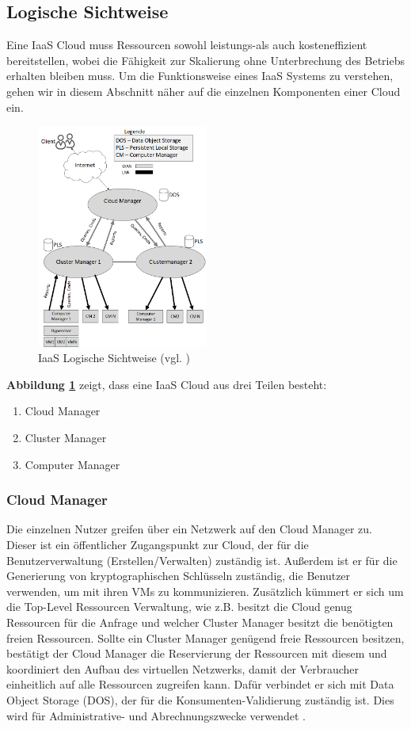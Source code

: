 \subsection{Logische Sichtweise}
Eine IaaS Cloud muss Ressourcen sowohl leistungs-als auch kosteneffizient bereitstellen, wobei die Fähigkeit zur Skalierung ohne Unterbrechung des Betriebs erhalten bleiben muss.
Um die Funktionsweise eines IaaS Systems zu verstehen, gehen wir in diesem Abschnitt näher auf die einzelnen Komponenten einer Cloud ein.
\begin{figure}[h]
    \centering
	\includegraphics[width=0.5\textwidth]{Images/IaaSLogic}
	\caption{IaaS Logische Sichtweise (vgl. \cite{Badger})}
	\label{IaaSLogic}
\end{figure}
\textbf{Abbildung \ref{IaaSLogic}} zeigt, dass eine IaaS Cloud aus drei Teilen besteht:
\begin{enumerate}
	\item Cloud Manager
	\item Cluster Manager
	\item Computer Manager
\end{enumerate}

\subsubsection{Cloud Manager}
Die einzelnen Nutzer greifen über ein Netzwerk auf den Cloud Manager zu. Dieser ist ein öffentlicher Zugangspunkt zur Cloud, der für die Benutzerverwaltung (Erstellen/Verwalten) zuständig ist. 
Außerdem ist er für die Generierung von kryptographischen Schlüsseln zuständig, die Benutzer verwenden, um mit ihren VMs zu kommunizieren.
Zusätzlich kümmert er sich um die Top-Level Ressourcen Verwaltung, wie z.B. besitzt die Cloud genug Ressourcen für die Anfrage und welcher Cluster Manager besitzt die benötigten freien Ressourcen.
Sollte ein Cluster Manager genügend freie Ressourcen besitzen, bestätigt der Cloud Manager die Reservierung der Ressourcen mit diesem und koordiniert den Aufbau des virtuellen Netzwerks, damit der Verbraucher einheitlich auf alle Ressourcen zugreifen kann.
Dafür verbindet er sich mit Data Object Storage (DOS), der für die Konsumenten-Validierung zuständig ist. Dies wird für Administrative- und Abrechnungszwecke verwendet \cite{Badger}.

